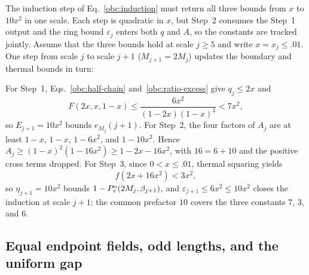 The induction step of Eq.~\eqref{obc:induction} must return all three
bounds from $x$ to $10x^2$ in one scale. Each step is quadratic in $x$,
but Step~2 consumes the Step~1 output and the ring bound $\varepsilon_j$ enters both
$q$ and $A$, so the constants are tracked jointly. Assume that the
three bounds hold at scale $j\ge5$ and write $x=x_j\le.01$. One step
from scale $j$ to scale $j+1$ ($M_{j+1}=2M_j$) updates the boundary and
thermal bounds in turn:
\begin{proofdiagram}
    \begin{prooflanes}\def\lanedy{1.05}
    \end{prooflanes}
\end{proofdiagram}
For Step~1, Eqs.~\eqref{obc:half-chain} and~\eqref{obc:ratio-excess}
give $q_j\le2x$ and
\begin{equation}
    F(2x,x,1-x)
    \le\frac{6x^2}{(1-2x)(1-x)^3}<7x^2,
    \label{obc:boundary-step}
\end{equation}
so $E_{j+1}=10x^2$ bounds $e_{M_j}(j+1)$. For Step~2, the four factors
of $A_j$ are at least $1-x$, $1-x$, $1-6x^2$, and $1-10x^2$. Hence
$A_j\ge(1-x)^2(1-16x^2)\ge1-2x-16x^2$, with $16=6+10$ and the positive
cross terms dropped. For Step~3, since $0<x\le.01$, thermal squaring
yields
\begin{equation}
    f(2x+16x^2)<3x^2,
    \label{obc:thermal-step}
\end{equation}
so $\eta_{j+1}=10x^2$ bounds $1-P_{\tau}^{\mathrm{o}}(2M_j,\beta_{j+1})$, and
$\varepsilon_{j+1}\le6x^2\le10x^2$ closes the induction at scale $j+1$;
the common prefactor $10$ covers the three constants $7$, $3$, and $6$.

\subsection{Equal endpoint fields, odd lengths, and the uniform gap}
\label{obc:comparison}

